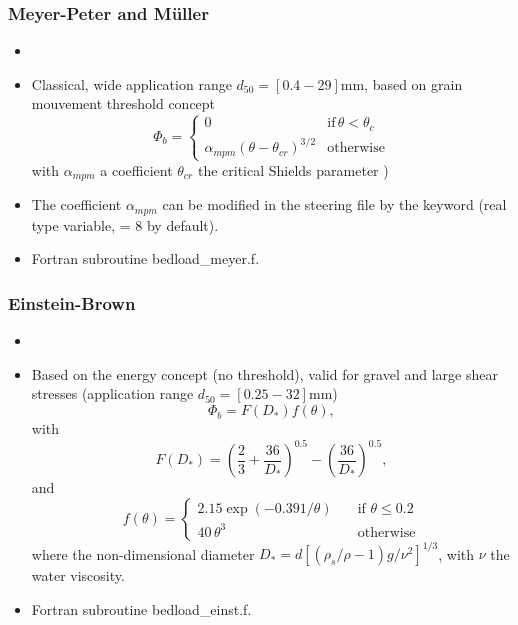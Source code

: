 \subsubsection{Meyer-Peter and M\"uller}
\begin{itemize}
\item {}
\item Classical, wide application range $d_{50} = [0.4-29]$mm, based on grain mouvement threshold concept
\begin{equation*}
\Phi_b=\left\{\begin{array}{ll}
0 & \text{if}\,\theta<\theta_c\\
\alpha_{mpm}(\theta-\theta_{cr})^{3/2} & \text{otherwise}
\end{array}
\right.
\end{equation*}
with $\alpha_{mpm}$ a coefficient $\theta_{cr}$ the critical Shields parameter )

\item The coefficient $\alpha_{mpm}$ can be modified in the steering file by the keyword  (real type variable, {\ttfamily = 8} by default). 

\item Fortran subroutine {\ttfamily bedload\_meyer.f}.

\end{itemize}

\subsubsection{Einstein-Brown}
\begin{itemize}
\item {}
\item Based on the energy concept (no threshold), valid for gravel and large shear
stresses (application range $d_{50} = [0.25-32]$mm)
\begin{equation*}
\Phi_b = F(D_*)f(\theta), 
\end{equation*}
with
\begin{equation*}\label{eq:EinsteinFDs}
F(D_*) = \left(\frac{2}{3} +\frac{36}{D_*}\right)^{0.5} - \left( \frac{36}{D_*}\right)^{0.5}, 
\end{equation*}
and
\begin{equation*}
f(\theta)=\left\{\begin{array}{ll}
2.15\exp(-0.391/\theta) & \quad\text{if}\,\,\theta \leq 0.2 \\
40\,\theta^{3}          & \quad\text{otherwise}
\end{array}
\right.
\end{equation*}
where the non-dimensional diameter $D_*=d[(\rho_s/\rho-1)g/\nu^2]^{1/3}$, with $\nu$ the water viscosity.
\item Fortran subroutine {\ttfamily bedload\_einst.f}.
\end{itemize}

